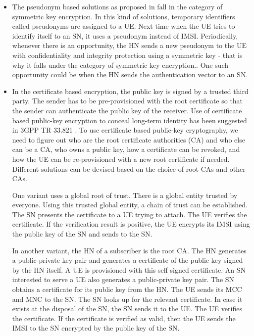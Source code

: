 \documentclass[conference]{IEEEtran}
\begin{document}
\begin{itemize}
\item The pseudonym based solutions as proposed in \cite{pseudonym_ericsson,pseudonym_valtteri_philip,CCS15,SSR15} fall in the category of symmetric key encryption.  In this kind of solutions, temporary identifiers called pseudonyms are assigned to a UE. Next time when the UE tries to identify itself to an SN, it uses a pseudonym instead of IMSI. Periodically, whenever there is an opportunity, the HN sends a new pseudonym to the UE with confidentiality and integrity protection using a symmetric key - that is why it falls under the category of symmetric key encryption.. One such opportunity could be when the HN sends the authentication vector to an SN.

\item In the certificate based encryption, the public key is signed by a trusted third party. The sender has to be pre-provisioned with the root certificate so that the sender can authenticate the public key of the receiver. Use of certificate based public-key encryption to conceal long-term identity has been suggested in 3GPP TR 33.821 \cite{TR33821}. To use certificate based public-key cryptography, we need to figure out who are the root certificate authorities (CA) and who else can be a CA, who owns a public key, how a certificate can be revoked, and how the UE can be re-provisioned with a new root certificate if needed. Different solutions can be devised based on the choice of root CAs and other CAs. 


One variant uses a global root of trust. There is a global entity trusted by everyone. Using this trusted global entity, a chain of trust can be established. The SN presents the certificate to a UE trying to attach. The UE verifies the certificate. If the verification result is positive, the UE encrypts its IMSI using the public key of the SN and sends to the SN. 

In another variant, the HN of a subscriber is the root CA. The HN generates a public-private key pair and generates a certificate of the public key signed by the HN itself. A UE is provisioned with this self signed certificate. An SN interested to serve a UE also generates a public-private key pair. The SN obtains a certificate for its public key from the HN. The UE sends its MCC and MNC to the SN. The SN looks up for the relevant certificate. In case it exists at the disposal of the SN, the SN sends it to the UE. The UE verifies the certificate. If the certificate is verified as valid, then the UE sends the IMSI to the SN encrypted by the public key of the SN.


\end{itemize}
\end{document}
